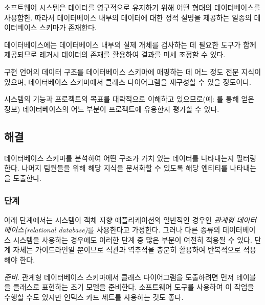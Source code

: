 \documentclass[a4paper,10pt,twoside]{book}
\begin{document}
\begin{bulletlist}
\item 소프트웨어 시스템은 데이터를 영구적으로 유지하기 위해 어떤 형태의 데이터베이스를 사용합한. 따라서 데이터베이스 내부의 데이터에 대한 정적 설명을 제공하는 일종의 데이터베이스 스키마가 존재한다.

\item 데이터베이스에는 데이터베이스 내부의 실제 개체를 검사하는 데 필요한 도구가 함께 제공되므로 레거시 데이터의 존재를 활용하여 결과를 미세 조정할 수 있다.

\item 구현 언어의 데이터 구조를 데이터베이스 스키마에 매핑하는 데 어느 정도 전문 지식이 있으며, 데이터베이스 스키마에서 클래스 다이어그램을 재구성할 수 있을 정도이다.

\item 시스템의 기능과 프로젝트의 목표를 대략적으로 이해하고 있으므로(예: 를 통해 얻은 정보) 데이터베이스의 어느 부분이 프로젝트에 유용한지 평가할 수 있다.
\end{bulletlist}

\subsection*{해결}

데이터베이스 스키마를 분석하여 어떤 구조가 가치 있는 데이터를 나타내는지 필터링한다. 나머지 팀원들을 위해 해당 지식을 문서화할 수 있도록 해당 엔티티를 나타내는 을 도출한다.

\subsubsection*{단계}

아래 단계에서는 시스템이 객체 지향 애플리케이션의 일반적인 경우인 \emph{관계형 데이터베이스(relational database)}를 사용한다고 가정한다. 그러나 다른 종류의 데이터베이스 시스템을 사용하는 경우에도 이러한 단계 중 많은 부분이 여전히 적용될 수 있다. 단계 자체는 가이드라인일 뿐이므로 직관과 역추적을 충분히 활용하여 반복적으로 적용해야 한다.

\noindent
\emph{준비.}
관계형 데이터베이스 스키마에서 클래스 다이어그램을 도출하려면 먼저 테이블을 클래스로 표현하는 초기 모델을 준비한다. 소프트웨어 도구를 사용하여 이 작업을 수행할 수도 있지만 인덱스 카드 세트를 사용하는 것도 좋다.
\end{document}
